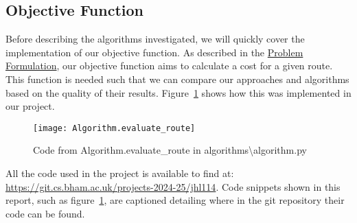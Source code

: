 
\subsection{Objective Function}\label{subsec:algorithms-objective-function}
Before describing the algorithms investigated, we will quickly cover the implementation of our objective function.
As described in the \hyperref[sec:problem-formulation]{Problem Formulation}, our objective function aims to
calculate a cost for a given route.
This function is needed such that we can compare our approaches and algorithms based on the quality of their results.
Figure~\ref{fig:Algorithm.evaluate_route} shows how this was implemented in our project.
\begin{figure}[H]
    \centering
    \texttt{[image: Algorithm.evaluate\_route]}
    \caption{Code from Algorithm.evaluate\_route in algorithms\textbackslash algorithm.py}
    \label{fig:Algorithm.evaluate_route}
\end{figure}

\noindent
All the code used in the project is available to find at: \url{https://git.cs.bham.ac.uk/projects-2024-25/jhl114}.
Code snippets shown in this report, such as figure~\ref{fig:Algorithm.evaluate_route}, are captioned
detailing where in the git repository their code can be found.

